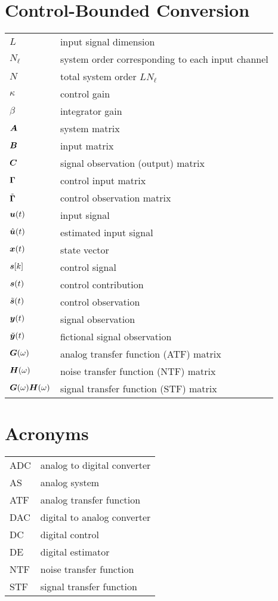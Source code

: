\section*{Control-Bounded Conversion}
\begin{tabular}{ p{2cm} l }
    $L$         &  input signal dimension \\
    $N_\ell$    &  system order corresponding to each input channel \\
    $N$         &  total system order $L N_\ell$ \\
    $\kappa$    &  control gain \\
    $\beta$     &  integrator gain \\
    $\bm{A}$     &  system matrix \\
    $\bm{B}$     &  input matrix \\
    $\bm{C}$     &  signal observation (output) matrix \\
    $\bm{\Gamma}$     &  control input matrix \\
    $\tilde{\bm{\Gamma}}$&  control observation matrix \\
    $\bm{u}(t)$      &  input signal \\
    $\hat{\bm{u}}(t)$   &  estimated input signal \\
    $\bm{x}(t)$      &  state vector \\
    $\bm{s}[k]$      &  control signal \\
    $\bm{s}(t)$      &  control contribution \\
    $\tilde{\bm{s}}(t)$ &  control observation \\
    $\bm{y}(t)$      &  signal observation \\
    $\breve{\bm{y}}(t)$ &  fictional signal observation \\
    $\bm{G}(\omega)$       &  analog transfer function (ATF) matrix \\
    $\bm{H}(\omega)$       &  noise transfer function (NTF) matrix \\
    $\bm{G}(\omega)\bm{H}(\omega)$    &  signal transfer function (STF) matrix \\


\end{tabular}

\section*{Acronyms}
\begin{tabular}{ p{2cm} l }
    ADC        &  analog to digital converter \\
    AS         &  analog system \\
    ATF        &  analog transfer function \\
    DAC        &  digital to analog converter \\
    DC         &  digital control \\
    DE         &  digital estimator \\
    NTF        &  noise transfer function \\
    STF        &  signal transfer function \\

\end{tabular}
